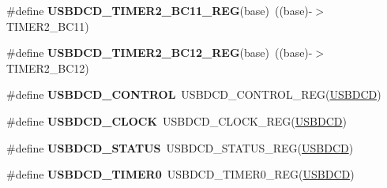 \begin{DoxyCompactItemize}
\item 
\#define {\bfseries U\+S\+B\+D\+C\+D\+\_\+\+T\+I\+M\+E\+R2\+\_\+\+B\+C11\+\_\+\+R\+EG}(base)~((base)-\/$>$T\+I\+M\+E\+R2\+\_\+\+B\+C11)\hypertarget{group__USBDCD__Register__Accessor__Macros_gafc77e996dc7db824a47b33bb77c9600d}{}\label{group__USBDCD__Register__Accessor__Macros_gafc77e996dc7db824a47b33bb77c9600d}

\item 
\#define {\bfseries U\+S\+B\+D\+C\+D\+\_\+\+T\+I\+M\+E\+R2\+\_\+\+B\+C12\+\_\+\+R\+EG}(base)~((base)-\/$>$T\+I\+M\+E\+R2\+\_\+\+B\+C12)\hypertarget{group__USBDCD__Register__Accessor__Macros_ga00959dbf32de31220bfb301f30a638d4}{}\label{group__USBDCD__Register__Accessor__Macros_ga00959dbf32de31220bfb301f30a638d4}

\item 
\#define {\bfseries U\+S\+B\+D\+C\+D\+\_\+\+C\+O\+N\+T\+R\+OL}~U\+S\+B\+D\+C\+D\+\_\+\+C\+O\+N\+T\+R\+O\+L\+\_\+\+R\+EG(\hyperlink{group__USBDCD__Peripheral__Access__Layer_gacd05c07582eca3f464f8c7436ed56ec1}{U\+S\+B\+D\+CD})\hypertarget{group__USBDCD__Register__Accessor__Macros_ga70240dec5113361c1f15695ed389e323}{}\label{group__USBDCD__Register__Accessor__Macros_ga70240dec5113361c1f15695ed389e323}

\item 
\#define {\bfseries U\+S\+B\+D\+C\+D\+\_\+\+C\+L\+O\+CK}~U\+S\+B\+D\+C\+D\+\_\+\+C\+L\+O\+C\+K\+\_\+\+R\+EG(\hyperlink{group__USBDCD__Peripheral__Access__Layer_gacd05c07582eca3f464f8c7436ed56ec1}{U\+S\+B\+D\+CD})\hypertarget{group__USBDCD__Register__Accessor__Macros_ga543817a50fb8eddab8be17eeac66ed2f}{}\label{group__USBDCD__Register__Accessor__Macros_ga543817a50fb8eddab8be17eeac66ed2f}

\item 
\#define {\bfseries U\+S\+B\+D\+C\+D\+\_\+\+S\+T\+A\+T\+US}~U\+S\+B\+D\+C\+D\+\_\+\+S\+T\+A\+T\+U\+S\+\_\+\+R\+EG(\hyperlink{group__USBDCD__Peripheral__Access__Layer_gacd05c07582eca3f464f8c7436ed56ec1}{U\+S\+B\+D\+CD})\hypertarget{group__USBDCD__Register__Accessor__Macros_gacf092152e7551433538eb6aace1bc43a}{}\label{group__USBDCD__Register__Accessor__Macros_gacf092152e7551433538eb6aace1bc43a}

\item 
\#define {\bfseries U\+S\+B\+D\+C\+D\+\_\+\+T\+I\+M\+E\+R0}~U\+S\+B\+D\+C\+D\+\_\+\+T\+I\+M\+E\+R0\+\_\+\+R\+EG(\hyperlink{group__USBDCD__Peripheral__Access__Layer_gacd05c07582eca3f464f8c7436ed56ec1}{U\+S\+B\+D\+CD})\hypertarget{group__USBDCD__Register__Accessor__Macros_ga696142965d4e1a121400c0f9e42e9c30}{}\label{group__USBDCD__Register__Accessor__Macros_ga696142965d4e1a121400c0f9e42e9c30}


\end{DoxyCompactItemize}
